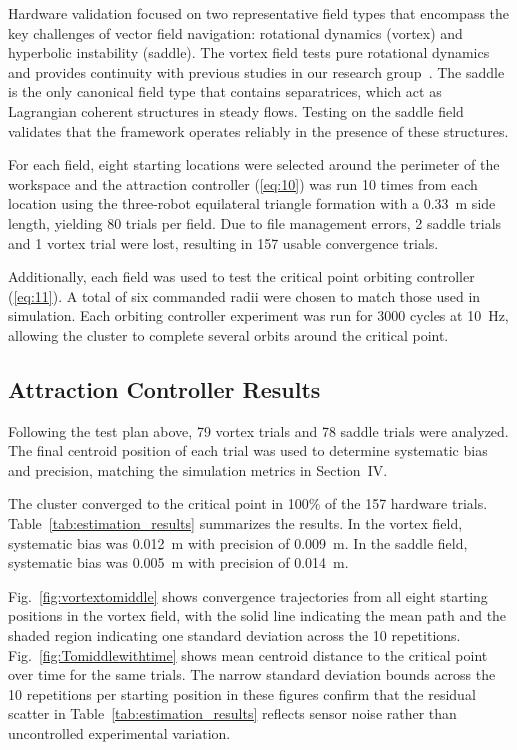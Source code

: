 \documentclass[lettersize,journal]{IEEEtran}
\begin{document}
Hardware validation focused on two representative field types that encompass the key challenges of vector field navigation: rotational dynamics (vortex) and hyperbolic instability (saddle). The vortex field tests pure rotational dynamics and provides continuity with previous studies in our research group~\cite{22,48}. The saddle is the only canonical field type that contains separatrices, which act as Lagrangian coherent structures in steady flows. Testing on 
the saddle field validates that the framework operates reliably in the presence of these structures.

For each field, eight starting locations were selected around the perimeter of the workspace and the attraction controller (\ref{eq:10}) was run 10 times from each location using the three-robot equilateral triangle formation with a 0.33~m side length, yielding 80 trials per field. Due to file management errors, 2 saddle trials and 1 vortex trial were lost, resulting in 157 usable convergence trials.

Additionally, each field was used to test the critical point orbiting controller (\ref{eq:11}). A total of six commanded radii were chosen to match those used in simulation. Each orbiting controller experiment was run for 3000 cycles at 10~Hz, allowing the cluster to complete several orbits around the critical point.

 \subsection{Attraction Controller Results}

Following the test plan above, 79 vortex trials and 78 saddle trials were analyzed. The final centroid position of each trial was used to determine systematic bias and precision, matching the simulation metrics in Section~IV.

The cluster converged to the critical point in 100\% of the 157 hardware trials. Table~\ref{tab:estimation_results} summarizes the results. In the vortex field, systematic bias was 0.012~m with precision of 0.009~m. In the saddle field, systematic bias was 0.005~m with precision of 0.014~m.

Fig.~\ref{fig:vortextomiddle} shows convergence trajectories from all eight starting positions in the vortex field, with the solid line indicating the mean path and the shaded region indicating one standard deviation across the 10 repetitions. Fig.~\ref{fig:Tomiddlewithtime} shows mean centroid distance to the critical point over time for the same trials. The narrow standard deviation bounds across the 10 repetitions per starting position in these figures confirm that the residual scatter in Table~\ref{tab:estimation_results} reflects sensor noise rather than uncontrolled experimental variation.
\end{document}
